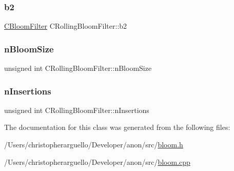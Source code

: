 \subsubsection{\texorpdfstring{b2}{b2}}
{\footnotesize\ttfamily \mbox{\hyperlink{class_c_bloom_filter}{C\+Bloom\+Filter}} C\+Rolling\+Bloom\+Filter\+::b2\hspace{0.3cm}{\ttfamily [private]}}

\mbox{\label{class_c_rolling_bloom_filter_a5fa63c717bd8b41c149bb0462fae7898}} 
\subsubsection{\texorpdfstring{n\+Bloom\+Size}{nBloomSize}}
{\footnotesize\ttfamily unsigned int C\+Rolling\+Bloom\+Filter\+::n\+Bloom\+Size\hspace{0.3cm}{\ttfamily [private]}}

\mbox{\label{class_c_rolling_bloom_filter_a393756a95c39b73f5f10d337ca12d5ac}} 
\subsubsection{\texorpdfstring{n\+Insertions}{nInsertions}}
{\footnotesize\ttfamily unsigned int C\+Rolling\+Bloom\+Filter\+::n\+Insertions\hspace{0.3cm}{\ttfamily [private]}}



The documentation for this class was generated from the following files\+:\begin{DoxyCompactItemize}
\item 
/\+Users/christopherarguello/\+Developer/anon/src/\mbox{\hyperlink{bloom_8h}{bloom.\+h}}\item 
/\+Users/christopherarguello/\+Developer/anon/src/\mbox{\hyperlink{bloom_8cpp}{bloom.\+cpp}}\end{DoxyCompactItemize}
